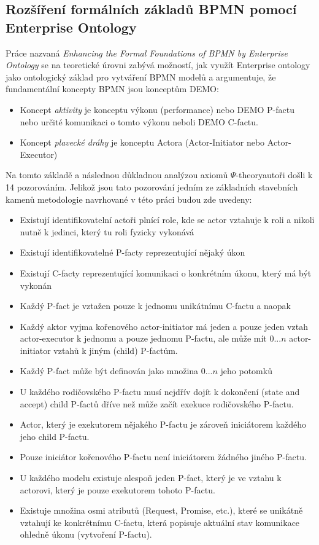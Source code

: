 \documentclass[]{article}
\newcommand{\ptheory}{$\Psi$-theory}
\begin{document}
\subsection{Rozšíření formálních základů BPMN pomocí Enterprise Ontology}

Práce \cite{VanNuffel2009} nazvaná \textit{Enhancing the Formal Foundations of BPMN by Enterprise Ontology} se na teoretické úrovni zabývá možností, jak využít Enterprise ontology jako ontologický základ pro vytváření BPMN modelů a argumentuje, že fundamentální koncepty BPMN jsou  konceptům DEMO:

\begin{itemize}
\item Koncept \textit{aktivity} je  konceptu výkonu (performance) nebo DEMO P-factu nebo určité komunikaci o tomto výkonu neboli DEMO C-factu.
\item Koncept \textit{plavecké dráhy} je  konceptu Actora (Actor-Initiator nebo Actor-Executor)
\end{itemize}

Na tomto základě a následnou důkladnou analýzou axiomů \ptheory autoři došli k 14 pozorováním. Jelikož jsou tato pozorování jedním ze základních stavebních kamenů metodologie navrhované v této práci budou zde uvedeny:

\begin{itemize}
\item Existují identifikovatelní actoři plnící role, kde se actor vztahuje k roli a nikoli nutně k jedinci, který tu roli fyzicky vykonává
\item Existují identifikovatelné P-facty reprezentující nějaký úkon
\item Existují C-facty reprezentující komunikaci o konkrétním úkonu, který má být vykonán
\item Každý P-fact je vztažen pouze k jednomu unikátnímu C-factu a naopak
\item Každý aktor vyjma kořenového actor-initiator má jeden a pouze jeden vztah actor-executor k jednomu a pouze jednomu P-factu, ale může mít $0...n$ actor-initiator vztahů k jiným (child) P-factům.
\item Každý P-fact může být definován jako množina $0...n$ jeho potomků %
\item U každého rodičovského P-factu musí nejdřív dojít k dokončení (state and accept) child P-factů dříve než může začít exekuce rodičovského P-factu.
\item Actor, který je exekutorem nějakého P-factu je zároveň iniciátorem každého jeho child P-factu.
\item Pouze iniciátor kořenového P-factu není iniciátorem žádného jiného P-factu.
\item U každého modelu existuje alespoň jeden P-fact, který je ve vztahu k actorovi, který je pouze exekutorem tohoto P-factu.
\item Existuje množina osmi atributů (Request, Promise, etc.), které se unikátně vztahují ke konkrétnímu C-factu, která  popisuje aktuální stav komunikace ohledně úkonu (vytvoření P-factu).
\end{itemize}
\end{document}
